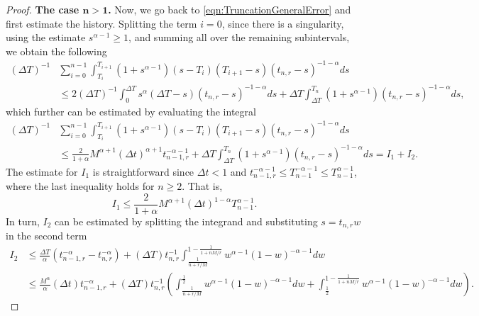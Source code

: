 \documentclass[12pt,a4paper]{article}
\begin{document}
\begin{proof}
	\medskip\noindent\textbf{The case $\mathbf{n>1}$.} Now, we go back to \eqref{eqn:TruncationGeneralError} and first estimate the history. Splitting the term $i=0$, since there is a singularity, using the estimate $s^{\alpha-1} \geq 1$, and summing all over the remaining subintervals, we obtain the following
	\begin{equation}
		\begin{split}
			(\Delta T)^{-1}&\sum_{i=0}^{n-1} \int_{T_i}^{T_{i+1}} (1+s^{\alpha-1})(s-T_i)(T_{i+1}-s)(t_{n,r}-s)^{-1-\alpha} ds \\
			&\leq 2(\Delta T)^{-1} \int_0^{\Delta T} s^\alpha (\Delta T -s)(t_{n,r}-s)^{-1-\alpha} ds + \Delta T\int_{\Delta T}^{T_n}(1+s^{\alpha-1})(t_{n,r}-s)^{-1-\alpha}ds,
		\end{split}
	\end{equation}
	which further can be estimated by evaluating the integral
	\begin{equation}
		\begin{split}
			(\Delta T)^{-1}&\sum_{i=0}^{n-1} \int_{T_i}^{T_{i+1}} (1+s^{\alpha-1})(s-T_i)(T_{i+1}-s)(t_{n,r}-s)^{-1-\alpha} ds \\
			&\leq \frac{2}{1+\alpha} M^{\alpha+1}(\Delta t)^{\alpha+1} t_{n-1,r}^{-\alpha-1} + \Delta T\int_{\Delta T}^{T_n}(1+s^{\alpha-1})(t_{n,r}-s)^{-1-\alpha}ds = I_1 + I_2.
		\end{split}
	\end{equation}
	The estimate for $I_1$ is straightforward since $\Delta t < 1$ and $t_{n-1,r}^{-\alpha-1} \leq T_{n-1}^{-\alpha-1} \leq T^{\alpha-1}_{n-1}$, where the last inequality holds for $n\geq 2$. That is,  
	\begin{equation}
		I_1 \leq \frac{2}{1+\alpha} M^{\alpha+1}(\Delta t)^{1-\alpha} T_{n-1}^{\alpha-1}. 
	\end{equation}
	In turn, $I_2$ can be estimated by splitting the integrand and substituting $s=t_{n,r}w$ in the second term
	\begin{equation}
		\begin{split}
			I_2 &\leq \frac{\Delta T}{\alpha} \left(t_{n-1,r}^{-\alpha} - t_{n,r}^{-\alpha}\right) + (\Delta T) t_{n,r}^{-1}\int_{\frac{1}{n+r/M}}^{1-\frac{1}{1+nM/r}} w^{\alpha-1} (1-w)^{-\alpha-1} dw \\
			&\leq \frac{M^{\alpha}}{\alpha}(\Delta t) t_{n-1,r}^{-\alpha} + (\Delta T) t_{n,r}^{-1} \left(\int_{\frac{1}{n+r/M}}^{\frac{1}{2}} w^{\alpha-1} (1-w)^{-\alpha-1} dw+\int_{\frac{1}{2}}^{1-\frac{1}{1+nM/r}} w^{\alpha-1} (1-w)^{-\alpha-1} dw\right).
		\end{split}

\end{equation}
\end{proof}
\end{document}
